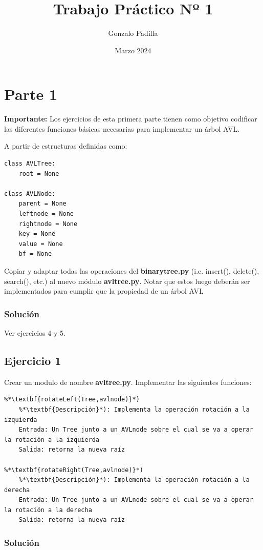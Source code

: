 \documentclass{article}
\title{Trabajo Práctico Nº 1}
\author{Gonzalo Padilla}
\date{Marzo 2024}
\begin{document}
\maketitle
\pagestyle{fancy}


\section*{Parte 1}

\textbf{Importante:} Los ejercicios de esta primera parte tienen como objetivo codificar las diferentes funciones básicas necesarias para implementar un árbol AVL.

A partir de estructuras definidas como:

\begin{lstlisting}
class AVLTree:
    root = None

class AVLNode:
    parent = None
    leftnode = None
    rightnode = None
    key = None
    value = None
    bf = None
\end{lstlisting}

Copiar y adaptar todas las operaciones del \textbf{binarytree.py} (i.e. insert(), delete(), search(), etc.) al nuevo módulo \textbf{avltree.py}. Notar que estos luego deberán ser implementados para cumplir que la propiedad de un árbol AVL
\subsubsection*{Solución}
Ver ejercicios 4 y 5.


\subsection*{Ejercicio 1}
Crear un modulo de nombre \textbf{avltree.py}. Implementar las siguientes funciones:
\begin{lstlisting}
%*\textbf{rotateLeft(Tree,avlnode)}*)
    %*\textbf{Descripción}*): Implementa la operación rotación a la izquierda
    Entrada: Un Tree junto a un AVLnode sobre el cual se va a operar la rotación a la izquierda
    Salida: retorna la nueva raíz

%*\textbf{rotateRight(Tree,avlnode)}*)
    %*\textbf{Descripción}*): Implementa la operación rotación a la derecha
    Entrada: Un Tree junto a un AVLnode sobre el cual se va a operar la rotación a la derecha
    Salida: retorna la nueva raíz
\end{lstlisting}
\subsubsection*{Solución}
\inputminted{python3}{./code/snippets/ejercicio1.py}
\end{document}
